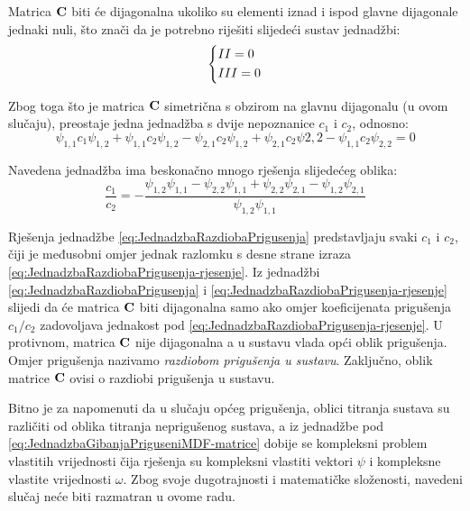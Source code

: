 Matrica $\mathbf{C}$ biti će dijagonalna ukoliko su elementi iznad i ispod glavne dijagonale
jednaki nuli, što znači da je potrebno riješiti slijedeći sustav jednadžbi:
\begin{equation}
    \begin{dcases}
        II=0\\
        III=0
    \end{dcases}
\end{equation}

Zbog toga što je matrica $\mathbf{C}$ simetrična s obzirom na glavnu dijagonalu (u ovom
slučaju), preostaje jedna jednadžba s dvije nepoznanice $c_1$ i $c_2$, odnosno:
\begin{equation}\label{eq:JednadzbaRazdiobaPrigusenja}
    \psi_{1,1}c_1\psi_{1,2}+\psi_{1,1}c_2\psi_{1,2}-\psi_{2,1}c_2\psi_{1,2}+\psi_{2,1}c_2\psi{2,2}-\psi_{1,1}c_2\psi_{2,2}=0
\end{equation}

Navedena jednadžba ima beskonačno mnogo rješenja slijedećeg oblika:
\begin{equation}\label{eq:JednadzbaRazdiobaPrigusenja-rjesenje}
    \frac{c_1}{c_2} = -\frac{\psi_{1,2}\psi_{1,1}-\psi_{2,2}\psi_{1,1}+\psi_{2,2}\psi_{2,1}-\psi_{1,2}\psi_{2,1}}
                            {\psi_{1,2}\psi_{1,1}}
\end{equation}

Rješenja jednadžbe \eqref{eq:JednadzbaRazdiobaPrigusenja}
predstavljaju svaki $c_1$ i $c_2$, čiji je međusobni omjer jednak razlomku s desne
strane izraza \eqref{eq:JednadzbaRazdiobaPrigusenja-rjesenje}. Iz jednadžbi
\eqref{eq:JednadzbaRazdiobaPrigusenja} i \eqref{eq:JednadzbaRazdiobaPrigusenja-rjesenje} 
slijedi da će matrica $\mathbf{C}$ biti dijagonalna samo ako omjer koeficijenata prigušenja $c_1/c_2$ 
zadovoljava jednakost pod \eqref{eq:JednadzbaRazdiobaPrigusenja-rjesenje}. U
protivnom, matrica $\mathbf{C}$ nije dijagonalna a u sustavu vlada opći oblik prigušenja.
Omjer prigušenja nazivamo \textit{razdiobom prigušenja u sustavu}. Zaključno, oblik
matrice $\mathbf{C}$ ovisi o razdiobi prigušenja u sustavu.
\par

Bitno je za napomenuti da u slučaju općeg prigušenja, oblici titranja sustava
su različiti od oblika titranja neprigušenog sustava, a iz jednadžbe pod
\eqref{eq:JednadzbaGibanjaPriguseniMDF-matrice} dobije se kompleksni problem
vlastitih vrijednosti čija rješenja su kompleksni vlastiti vektori $\psi$ i
kompleksne vlastite vrijednosti $\omega$. Zbog svoje dugotrajnosti i matematičke složenosti,
navedeni slučaj neće biti razmatran u ovome radu.
\par

